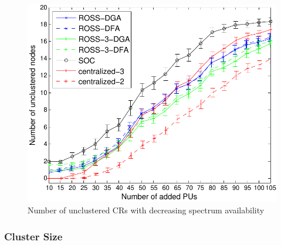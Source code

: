 \documentclass[times]{ettauth}
\theoremstyle{mytheoremstyle}
\theoremstyle{mytheoremstyle}
\theoremstyle{mytheoremstyle}
\begin{document}
\begin{figure}[th]
\begin{multicols}{3}
    \includegraphics[width=\linewidth]{survival_rate_20.pdf}\par\caption{Number of unclustered CRs with decreasing spectrum availability}\label{singleton_clusters}
\end{multicols}
\label{compare_dis_centralized}
\end{figure}



\subsubsection{Cluster Size}
\label{cluster_size}
\end{document}
